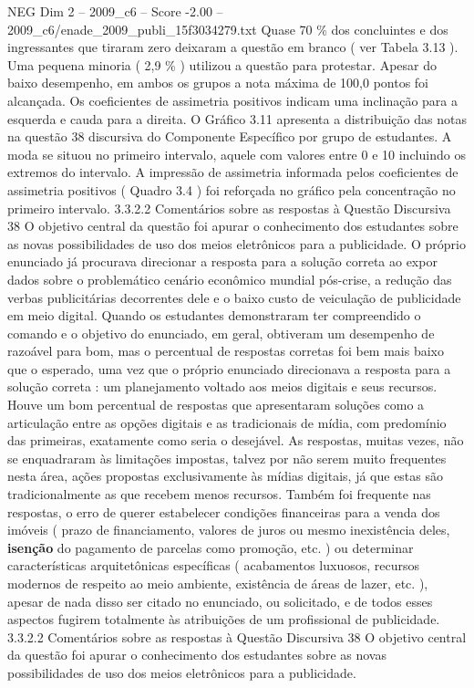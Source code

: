 \begin{textsample}{NEG Dim 2 – 2009\_c6 – Score -2.00 – 2009\_c6/enade\_2009\_publi\_15f3034279.txt}
Quase 70 \% dos concluintes e dos ingressantes que tiraram zero deixaram a questão em branco ( ver Tabela 3.13 ).
Uma pequena minoria ( 2,9 \% ) utilizou a questão para protestar.
Apesar do baixo desempenho, em ambos os grupos a nota máxima de 100,0 pontos foi alcançada.
Os coeficientes de assimetria positivos indicam uma inclinação para a esquerda e cauda para a direita.
O Gráfico 3.11 apresenta a distribuição das notas na questão 38 discursiva do Componente Específico por grupo de estudantes.
A moda se situou no primeiro intervalo, aquele com valores entre 0 e 10 incluindo os extremos do intervalo.
A impressão de assimetria informada pelos coeficientes de assimetria positivos ( Quadro 3.4 ) foi reforçada no gráfico pela concentração no primeiro intervalo. 3.3.2.2 Comentários sobre as respostas à Questão Discursiva 38 O objetivo central da questão foi apurar o conhecimento dos estudantes sobre as novas possibilidades de uso dos meios eletrônicos para a publicidade.
O próprio enunciado já procurava direcionar a resposta para a solução correta ao expor dados sobre o problemático cenário econômico mundial pós-crise, a redução das verbas publicitárias decorrentes dele e o baixo custo de veiculação de publicidade em meio digital.
Quando os estudantes demonstraram ter compreendido o comando e o objetivo do enunciado, em geral, obtiveram um desempenho de razoável para bom, mas o percentual de respostas corretas foi bem mais baixo que o esperado, uma vez que o próprio enunciado direcionava a resposta para a solução correta : um planejamento voltado aos meios digitais e seus recursos.
Houve um bom percentual de respostas que apresentaram soluções como a articulação entre as opções digitais e as tradicionais de mídia, com predomínio das primeiras, exatamente como seria o desejável.
As respostas, muitas vezes, não se enquadraram às limitações impostas, talvez por não serem muito frequentes nesta área, ações propostas exclusivamente às mídias digitais, já que estas são tradicionalmente as que recebem menos recursos.
Também foi frequente nas respostas, o erro de querer estabelecer condições financeiras para a venda dos imóveis ( prazo de financiamento, valores de juros ou mesmo inexistência deles, \textbf{isenção} do pagamento de parcelas como promoção, etc. ) ou determinar características arquitetônicas específicas ( acabamentos luxuosos, recursos modernos de respeito ao meio ambiente, existência de áreas de lazer, etc. ), apesar de nada disso ser citado no enunciado, ou solicitado, e de todos esses aspectos fugirem totalmente às atribuições de um profissional de publicidade. 3.3.2.2 Comentários sobre as respostas à Questão Discursiva 38 O objetivo central da questão foi apurar o conhecimento dos estudantes sobre as novas possibilidades de uso dos meios eletrônicos para a publicidade.

\end{textsample}
